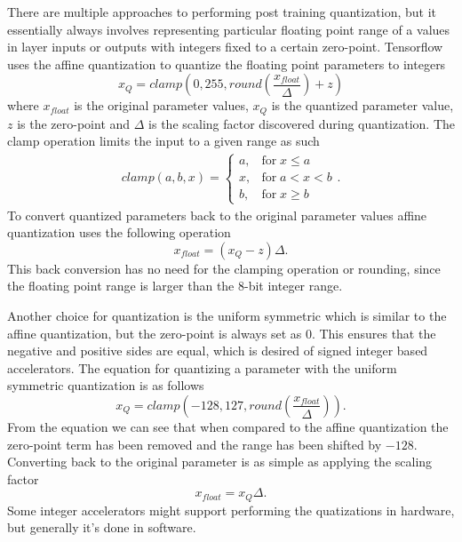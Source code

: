 \documentclass[12pt,a4paper,english
]{tunithesis}
\begin{document}
There are multiple approaches to performing post training quantization, but it essentially always involves representing particular floating point range of a values in layer inputs or outputs with integers fixed to a certain zero-point. Tensorflow uses the affine quantization to quantize the floating point parameters to integers
\begin{equation}
x_{Q} = clamp(0, 255, round(\frac{x_{float}}{\Delta}) + z)
\end{equation}
where $x_{float}$ is the original parameter values, $x_{Q}$ is the quantized parameter value, $z$ is the zero-point and $\Delta$ is the scaling factor discovered during quantization.
The clamp operation limits the input to a given range as such
\begin{align}
  \label{eq:clamp}
clamp(a, b, x) =
  \begin{cases}
    a, & \text{for} \; x \leq a  \\
                x, & \text{for} \; a < x < b  \\
                b, & \text{for} \; x \geq b
  \end{cases}.
\end{align}
To convert quantized parameters back to the original parameter values affine quantization uses the following operation
\begin{equation}
x_{float} = (x_{Q}-z)\Delta.
\end{equation}
This back conversion has no need for the clamping operation or rounding, since the floating point range is larger than the 8-bit integer range.

Another choice for quantization is the uniform symmetric which is similar to the affine quantization, but the zero-point is always set as 0. This ensures that the negative and positive sides are equal, which is desired of signed integer based accelerators. The equation for quantizing a parameter with the uniform symmetric quantization is as follows
\begin{equation}
x_{Q} = clamp(-128, 127, round(\frac{x_{float}}{\Delta})).
\end{equation}
From the equation we can see that when compared to the affine quantization the zero-point term has been removed and the range has been shifted by $-128$. Converting back to the original parameter is as simple as applying the scaling factor
\begin{equation}
x_{float} = x_{Q}\Delta.
\end{equation}
Some integer accelerators might support performing the quatizations in hardware, but generally it's done in software.
\end{document}
